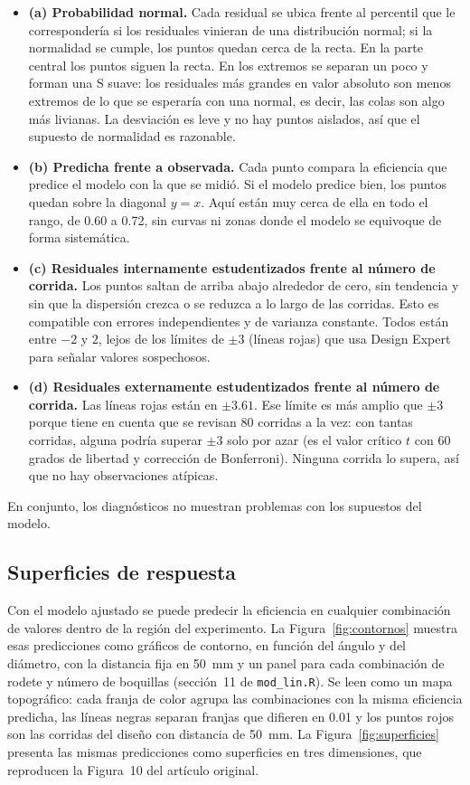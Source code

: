 \begin{itemize}
  \item \textbf{(a) Probabilidad normal.} Cada residual se ubica frente al percentil que le correspondería si los residuales vinieran de una distribución normal; si la normalidad se cumple, los puntos quedan cerca de la recta. En la parte central los puntos siguen la recta. En los extremos se separan un poco y forman una S suave: los residuales más grandes en valor absoluto son menos extremos de lo que se esperaría con una normal, es decir, las colas son algo más livianas. La desviación es leve y no hay puntos aislados, así que el supuesto de normalidad es razonable.
  \item \textbf{(b) Predicha frente a observada.} Cada punto compara la eficiencia que predice el modelo con la que se midió. Si el modelo predice bien, los puntos quedan sobre la diagonal $y = x$. Aquí están muy cerca de ella en todo el rango, de 0.60 a 0.72, sin curvas ni zonas donde el modelo se equivoque de forma sistemática.
  \item \textbf{(c) Residuales internamente estudentizados frente al número de corrida.} Los puntos saltan de arriba abajo alrededor de cero, sin tendencia y sin que la dispersión crezca o se reduzca a lo largo de las corridas. Esto es compatible con errores independientes y de varianza constante. Todos están entre $-2$ y $2$, lejos de los límites de $\pm 3$ (líneas rojas) que usa Design Expert para señalar valores sospechosos.
  \item \textbf{(d) Residuales externamente estudentizados frente al número de corrida.} Las líneas rojas están en $\pm 3.61$. Ese límite es más amplio que $\pm 3$ porque tiene en cuenta que se revisan 80 corridas a la vez: con tantas corridas, alguna podría superar $\pm 3$ solo por azar (es el valor crítico $t$ con 60 grados de libertad y corrección de Bonferroni). Ninguna corrida lo supera, así que no hay observaciones atípicas.
\end{itemize}

En conjunto, los diagnósticos no muestran problemas con los supuestos del modelo.

\subsection{Superficies de respuesta}

Con el modelo ajustado se puede predecir la eficiencia en cualquier combinación de valores dentro de la región del experimento. La Figura~\ref{fig:contornos} muestra esas predicciones como gráficos de contorno, en función del ángulo y del diámetro, con la distancia fija en 50~mm y un panel para cada combinación de rodete y número de boquillas (sección~11 de \texttt{mod\_lin.R}). Se leen como un mapa topográfico: cada franja de color agrupa las combinaciones con la misma eficiencia predicha, las líneas negras separan franjas que difieren en 0.01 y los puntos rojos son las corridas del diseño con distancia de 50~mm. La Figura~\ref{fig:superficies} presenta las mismas predicciones como superficies en tres dimensiones, que reproducen la Figura~10 del artículo original.


